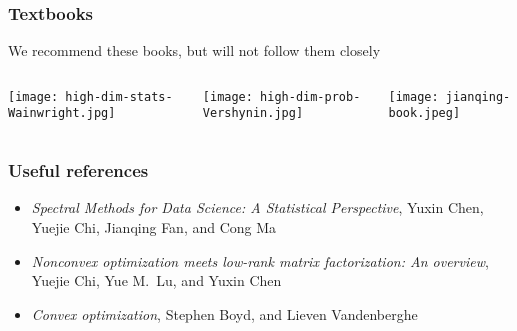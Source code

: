 \documentclass[compress,
mathserif,wide,%
]{beamer}
\begin{document}
\begin{frame}
\frametitle{Textbooks}

We recommend these  books, but will not follow them closely

\begin{columns}
  \begin{column}{0.32\textwidth}
  \begin{center}
    \texttt{[image: high-dim-stats-Wainwright.jpg]}
  \end{center}


  \end{column} 

  \begin{column}{0.32\textwidth}
  \begin{center}
     \texttt{[image: high-dim-prob-Vershynin.jpg]}
  \end{center}

  \end{column}

  \begin{column}{0.32\textwidth}
  \begin{center}

    \texttt{[image: jianqing-book.jpeg]}
  \end{center} 

  \end{column} 


\end{columns}

\end{frame}

\begin{frame}
  \frametitle{Useful references}

\begin{itemize}
  \item {\textit{Spectral Methods for Data Science: A Statistical Perspective}},  Yuxin Chen, Yuejie Chi, Jianqing Fan, and Cong Ma 
\item {\textit{Nonconvex optimization meets low-rank matrix factorization: An overview}},  Yuejie Chi, Yue M.~Lu, and Yuxin Chen 
\item {\textit{Convex optimization}}, Stephen Boyd, and Lieven Vandenberghe

\end{itemize} 
\end{frame}
\end{document}
